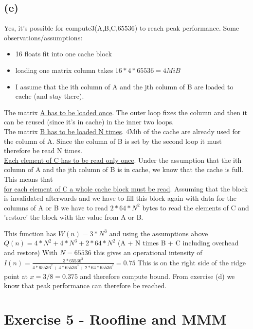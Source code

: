 \documentclass[10pt,a4paper,oneside,notitlepage]{report}
\begin{document}
\subsection*{(e)}
Yes, it's possible for compute3(A,B,C,65536) to reach peak performance. 
Some observations/assumptions:
\begin{itemize}
\item 16 floats fit into one cache block
\item loading one matrix column takes $16*4*65536=4MiB$
\item I assume that the ith column of A and the jth column of B are loaded to cache (and stay there).
\end{itemize}
The matrix \underline{A has to be loaded once}. The outer loop fixes the column and then it can be reused (since it's in cache) in the inner two loops.\\ The matrix \underline{B has to be loaded N times}. 4Mib of the cache are already used for the column of A. Since the column of B is set by the second loop it must therefore be read N times. \\
\underline{Each element of C has to be read only once}. Under the assumption that the ith column of A and the jth column of B is in cache, we know that the cache is full. This means that\\ \underline{for each element of C a whole cache block must be read}. Assuming that the block is invalidated afterwards and we have to fill this block again with data for the columns of A or B we have to read $2*64*N^2$ bytes to read the elements of C and 'restore' the block with the value from A or B.

This function has $W(n)=3*N^3$ and using the assumptions above\\ $Q(n)=4*N^2+4*N^3+2*64*N^2$ (A + N times B + C including overhead and restore) With $N=65536$ this gives an operational intensity of $\underline{I(n)=\frac{3*65536^3}{4*65536^2+4*65536^3+2*64*65536^2}=0.75}$
This is on the right side of the ridge point at $x=3/8=0.375$ and therefore compute bound. From exercise (d) we know that peak performance can therefore be reached.

\section*{Exercise 5 - Roofline and MMM}
\end{document}
